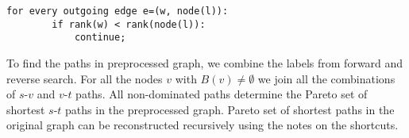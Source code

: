 \begin{lstlisting}[caption={Reverse Search},label=list:8-6,captionpos=t,float,abovecaptionskip=-\medskipamount]
    for every outgoing edge e=(w, node(l)):
    	if rank(w) < rank(node(l)):
        	continue;
\end{lstlisting}

To find the paths in preprocessed graph, we combine the labels from forward and reverse search. 
For all the nodes $v$ with $B(v) \ne \emptyset$ we join all the combinations of $s$-$v$ and $v$-$t$ paths. 
All non-dominated paths determine the Pareto set of shortest $s$-$t$ paths in the preprocessed graph.
Pareto set of shortest paths in the original graph can be reconstructed recursively using the notes on the shortcuts.

